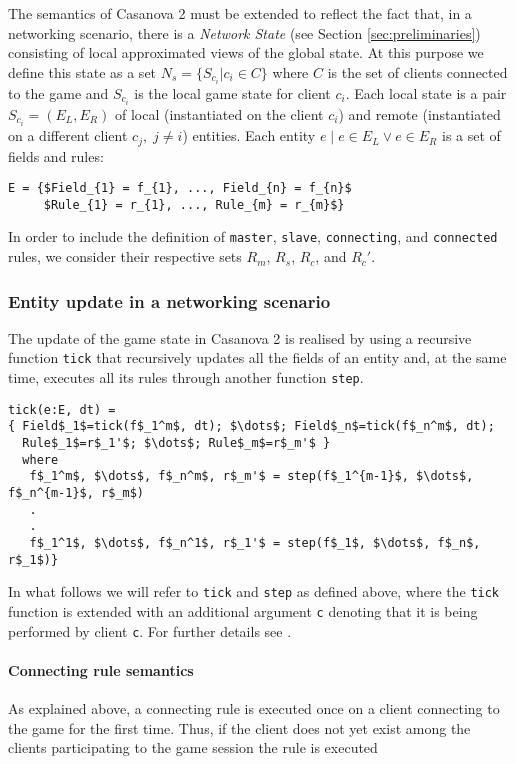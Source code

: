 The semantics of Casanova 2 must be extended to reflect the fact that, in a networking scenario, there is a \textit{Network State} (see Section \ref{sec:preliminaries}) consisting of local approximated views of the global state. At this purpose we define this state as a set $N_{s} = \lbrace S_{c_{i}} | c_{i} \in C \rbrace$ where $C$ is the set of clients connected to the game and $S_{c_{i}}$ is the local game state for client $c_{i}$. Each local state is a pair $S_{c_{i}} = (E_{L},E_{R})$ of local (instantiated on the client $c_{i}$) and remote (instantiated on a different client $c_{j}, \; j \neq i$) entities. Each entity $e \; | \; e \in E_{L} \vee e \in E_{R}$ is a set of fields and rules:

\begin{lstlisting}[mathescape = true]
E = {$Field_{1} = f_{1}, ..., Field_{n} = f_{n}$
     $Rule_{1} = r_{1}, ..., Rule_{m} = r_{m}$} 
\end{lstlisting}

In order to include the definition of \texttt{master}, \texttt{slave}, \texttt{connecting}, and \texttt{connected} rules, we consider their respective sets $R_{m}$, $R_{s}$, $R_{c}$, and $R_{c}'$.

\subsubsection{Entity update in a networking scenario}

The update of the game state in Casanova 2 is realised by using a recursive function \texttt{tick} that recursively updates all the fields of an entity and, at the same time, executes all its rules through another function \texttt{step}.

\begin{lstlisting}[mathescape]
tick(e:E, dt) =
{ Field$_1$=tick(f$_1^m$, dt); $\dots$; Field$_n$=tick(f$_n^m$, dt);
  Rule$_1$=r$_1'$; $\dots$; Rule$_m$=r$_m'$ }
  where
   f$_1^m$, $\dots$, f$_n^m$, r$_m'$ = step(f$_1^{m-1}$, $\dots$, f$_n^{m-1}$, r$_m$)
   .
   .
   f$_1^1$, $\dots$, f$_n^1$, r$_1'$ = step(f$_1$, $\dots$, f$_n$, r$_1$)}
\end{lstlisting}

In what follows we will refer to \texttt{tick} and \texttt{step} as defined above, where  the \texttt{tick} function is extended with an additional argument \texttt{c} denoting that it is being performed by client \texttt{c}. For further details see \cite{Abbadi2015}.

\paragraph{Connecting rule semantics}
As explained above, a connecting rule is executed once on a client connecting to the game for the first time. Thus, if the client does not yet exist among the clients participating to the game session the rule is executed

